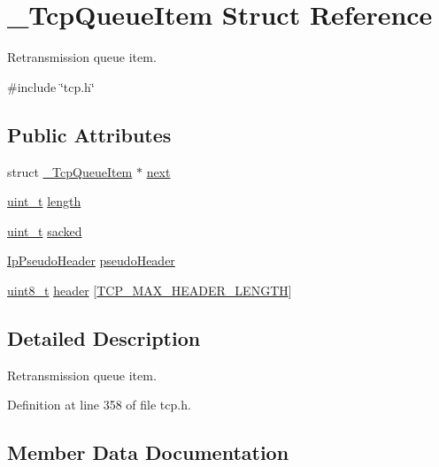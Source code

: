 \hypertarget{struct__TcpQueueItem}{}\section{\+\_\+\+Tcp\+Queue\+Item Struct Reference}
\label{struct__TcpQueueItem}


Retransmission queue item.  




{\ttfamily \#include \char`\"{}tcp.\+h\char`\"{}}

\subsection*{Public Attributes}
\begin{DoxyCompactItemize}
\item 
struct \hyperlink{struct__TcpQueueItem}{\+\_\+\+Tcp\+Queue\+Item} $\ast$ \hyperlink{struct__TcpQueueItem_a5e46d57271b1dcbf0a5d647ca67f2a86}{next}
\item 
\hyperlink{compiler__port_8h_a12a1e9b3ce141648783a82445d02b58d}{uint\+\_\+t} \hyperlink{struct__TcpQueueItem_a3c42cb4d2046a392570ab6f8dfa7a398}{length}
\item 
\hyperlink{compiler__port_8h_a12a1e9b3ce141648783a82445d02b58d}{uint\+\_\+t} \hyperlink{struct__TcpQueueItem_a18ca123a9505da49954d6af37058c6fd}{sacked}
\item 
\hyperlink{structIpPseudoHeader}{Ip\+Pseudo\+Header} \hyperlink{struct__TcpQueueItem_a2ddf7abb88b02f243eae7461ced90ef0}{pseudo\+Header}
\item 
\hyperlink{stdint_8h_aba7bc1797add20fe3efdf37ced1182c5}{uint8\+\_\+t} \hyperlink{struct__TcpQueueItem_a61325506bbe534b89f9308b7a1374d08}{header} \mbox{[}\hyperlink{tcp_8h_a296869e905bda7013716794027a5b07c}{T\+C\+P\+\_\+\+M\+A\+X\+\_\+\+H\+E\+A\+D\+E\+R\+\_\+\+L\+E\+N\+G\+TH}\mbox{]}
\end{DoxyCompactItemize}


\subsection{Detailed Description}
Retransmission queue item. 

Definition at line 358 of file tcp.\+h.



\subsection{Member Data Documentation}
\mbox{\label{struct__TcpQueueItem_a61325506bbe534b89f9308b7a1374d08}} 
